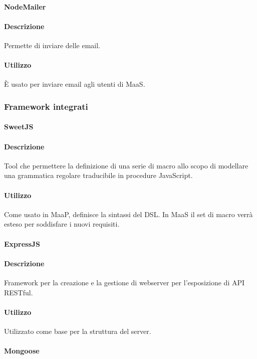 \paragraph{NodeMailer}
\paragraph*{Descrizione}
Permette di inviare delle email.

\paragraph*{Utilizzo}
È usato per inviare email agli utenti di MaaS.

\subsubsection{Framework integrati}
\paragraph{SweetJS}
\paragraph*{Descrizione}
Tool che permettere la definizione di una serie di macro allo scopo di modellare una grammatica regolare traducibile in procedure JavaScript.

\paragraph*{Utilizzo}
Come usato in MaaP, definisce la sintassi del DSL. In MaaS il set di macro verrà esteso per soddisfare i nuovi requisiti.

\paragraph{ExpressJS}
\paragraph*{Descrizione}
Framework per la creazione e la gestione di webserver per l'esposizione di API RESTful.

\paragraph*{Utilizzo}
Utilizzato come base per la struttura del server.

\paragraph{Mongoose}

